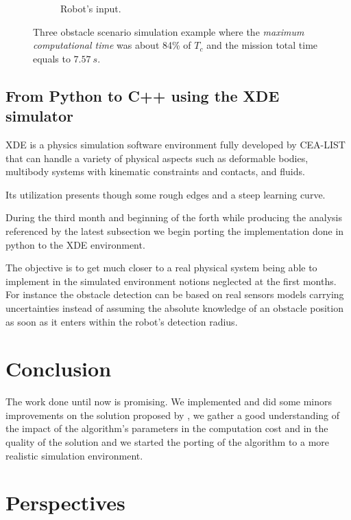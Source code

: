 \begin{figure}[!h]
\begin{subfigure}[b]{0.48\textwidth}
                \caption{Robot's input.}\label{fig:rinput}
        \end{subfigure}
        \caption{Three obstacle scenario simulation example where the \textit{maximum computational time} was about 84\% of $T_c$ and the mission total time equals to $7.57\ s$.}\label{fig:uni3}
\end{figure}

\subsection{From Python to C++ using the XDE simulator}

XDE is a physics simulation software environment fully developed by CEA-LIST that can handle a variety of physical aspects such as deformable bodies, multibody systems with kinematic constraints and contacts, and fluids.

Its utilization presents though some rough edges and a steep learning curve.

During the third month and beginning of the forth while producing the analysis referenced by the latest subsection we begin porting the implementation done in python to the XDE environment. 

The objective is to get much closer to a real physical system being able to implement in the simulated environment notions neglected at the first months. For instance the obstacle detection can be based on real sensors models carrying uncertainties instead of assuming the absolute knowledge of an obstacle position as soon as it enters within the robot's detection radius.

\section{Conclusion}

The work done until now is promising. We implemented and did some minors improvements on the solution proposed by \cite{Defoort2007a}, we gather a good understanding of the impact of the algorithm's parameters in the computation cost and in the quality of the solution and we started the porting of the algorithm to a more realistic simulation environment.
\section{Perspectives}

